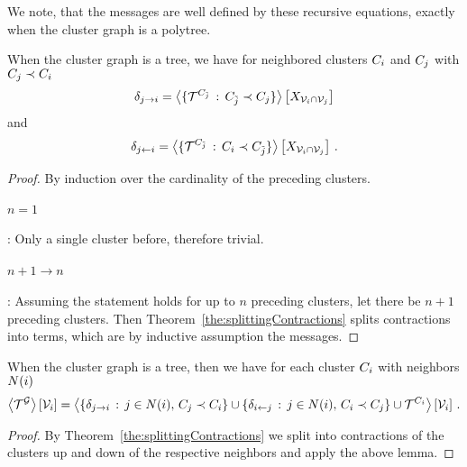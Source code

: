 We note, that the messages are well defined by these recursive equations, exactly when the cluster graph is a polytree.


\begin{lemma}
	When the cluster graph is a tree, we have for neighbored clusters $C_{i}$ and $C_{j}$ with $C_{j}\prec C_{i}$
		\[ \delta_{j \rightarrow i} 
		= \left\langle \{\mathcal{T}^{C_{\tilde{j}}} \, : \, C_{\tilde{j}} \prec C_{j} \}\right\rangle \left[ X_{\mathcal{V}_i\cap\mathcal{V}_j} \right]   \]
	and
		\[ \delta_{j \leftarrow i}
		= \left\langle \{\mathcal{T}^{C_{\tilde{j}}} \, : \, C_{i} \prec C_{\tilde{j}} \}\right\rangle \left[ X_{\mathcal{V}_i\cap\mathcal{V}_j} \right]  \, . \]
\end{lemma}
\begin{proof}
	By induction over the cardinality of the preceding clusters.
	\paragraph{$n=1$}: Only a single cluster before, therefore trivial.
	\paragraph{$n+1\rightarrow n$}: Assuming the statement holds for up to $n$ preceding clusters, let there be $n+1$ preceding clusters.
	Then Theorem~\ref{the:splittingContractions} splits contractions into terms, which are by inductive assumption the messages.
\end{proof}


\begin{theorem}
	When the cluster graph is a tree, then we have for each cluster $C_{i}$ with neighbors $N(i)$
	\begin{align}
		\left\langle \mathcal{T}^{\mathcal{G}}\right\rangle \left[ \mathcal{V}_i \right] = 
		\left\langle 
			\{ \delta_{j \rightarrow i}  \, : \, j \in N(i) , \, C_{j}\prec C_{i} \}  \cup 
			\{ \delta_{i \leftarrow j}  \, : \, j \in N(i),  \, C_{i}\prec C_{j} \} \cup \mathcal{T}^{C_{i}}
		\right\rangle \left[ \mathcal{V}_i \right] \, .
	\end{align}
\end{theorem}
\begin{proof}
	By Theorem~\ref{the:splittingContractions} we split into contractions of the clusters up and down of the respective neighbors and apply the above lemma.
\end{proof}





